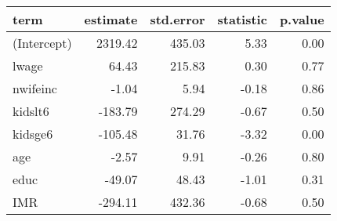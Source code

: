 \begin{tabular}{lrrrr}
  \hline
term & estimate & std.error & statistic & p.value \\ 
  \hline
(Intercept) & 2319.42 & 435.03 & 5.33 & 0.00 \\ 
  lwage & 64.43 & 215.83 & 0.30 & 0.77 \\ 
  nwifeinc & -1.04 & 5.94 & -0.18 & 0.86 \\ 
  kidslt6 & -183.79 & 274.29 & -0.67 & 0.50 \\ 
  kidsge6 & -105.48 & 31.76 & -3.32 & 0.00 \\ 
  age & -2.57 & 9.91 & -0.26 & 0.80 \\ 
  educ & -49.07 & 48.43 & -1.01 & 0.31 \\ 
  IMR & -294.11 & 432.36 & -0.68 & 0.50 \\ 
   \hline
\end{tabular}
